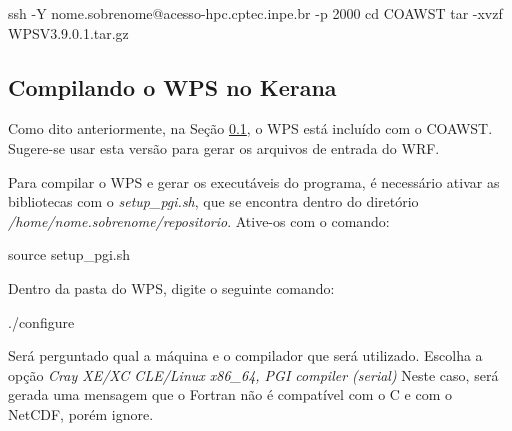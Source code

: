 \begin{bashcode}
ssh -Y nome.sobrenome@acesso-hpc.cptec.inpe.br -p 2000
cd COAWST
tar -xvzf WPSV3.9.0.1.tar.gz
\end{bashcode}
\bigskip

\subsection{Compilando o WPS no Kerana}\label{wpsker}
\bigskip

\begin{tcolorbox}[enhanced,
  grow to left by=0cm,%
  grow to right by=0cm,%
  enlarge top by=0cm,%
  enlarge bottom by=0cm,%
  tcbox raise base,
  boxrule=1.0pt,
  left=18mm,
  colframe=red!50!black,coltext=red!25!black,colback=red!10!white,
  overlay={\begin{tcbclipinterior}\fill[red!75!blue!50!white] (frame.south west)
    rectangle node[text=white,font=\sffamily\bfseries\footnotesize,rotate=0] {ATENÇÃO} ([xshift=18mm]frame.north west);\end{tcbclipinterior}}]
Como dito anteriormente, na Seção \textcolor{bleu_cite}{\ref{wpsker}}, o WPS está incluído com o COAWST. Sugere-se usar esta versão para gerar os arquivos de entrada do WRF.
\end{tcolorbox}
\bigskip

\noindent Para compilar o WPS e gerar os executáveis do programa, é necessário ativar as bibliotecas com o \textit{setup\_pgi.sh}, que se encontra dentro do diretório \textit{/home/nome.sobrenome/repositorio}. Ative-os com o comando:
\bigskip

\begin{bashcode}
source setup_pgi.sh
\end{bashcode}
\bigskip

\noindent Dentro da pasta do WPS, digite o seguinte comando:
\bigskip

\begin{bashcode}
./configure
\end{bashcode}
\bigskip

\noindent Será perguntado qual a máquina e o compilador que será utilizado. Escolha a opção \textit{Cray XE/XC CLE/Linux x86\_64, PGI compiler (serial)} Neste caso, será gerada uma mensagem que o Fortran não é compatível com o C e com o NetCDF, porém ignore.
\bigskip

